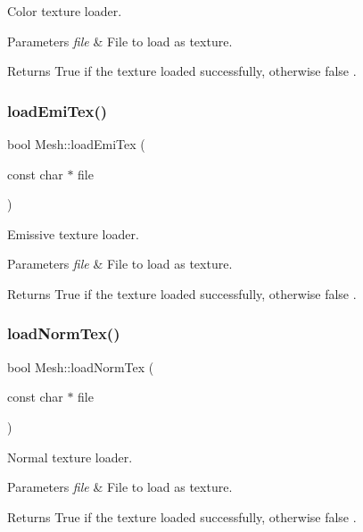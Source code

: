 Color texture loader. 


\begin{DoxyParams}{Parameters}
{\em file} & File to load as texture. \\
\hline
\end{DoxyParams}
\begin{DoxyReturn}{Returns}
True if the texture loaded successfully, otherwise false . 
\end{DoxyReturn}
\mbox{\label{class_mesh_abb21ce55711b89f7018d103b50294f69}} 
\subsubsection{\texorpdfstring{load\+Emi\+Tex()}{loadEmiTex()}}
{\footnotesize\ttfamily bool Mesh\+::load\+Emi\+Tex (\begin{DoxyParamCaption}\item[{const char $\ast$}]{file }\end{DoxyParamCaption})}



Emissive texture loader. 


\begin{DoxyParams}{Parameters}
{\em file} & File to load as texture. \\
\hline
\end{DoxyParams}
\begin{DoxyReturn}{Returns}
True if the texture loaded successfully, otherwise false . 
\end{DoxyReturn}
\mbox{\label{class_mesh_a443b1a0a0c36ff911f58f2a5f4616538}} 
\subsubsection{\texorpdfstring{load\+Norm\+Tex()}{loadNormTex()}}
{\footnotesize\ttfamily bool Mesh\+::load\+Norm\+Tex (\begin{DoxyParamCaption}\item[{const char $\ast$}]{file }\end{DoxyParamCaption})}



Normal texture loader. 


\begin{DoxyParams}{Parameters}
{\em file} & File to load as texture. \\
\hline
\end{DoxyParams}
\begin{DoxyReturn}{Returns}
True if the texture loaded successfully, otherwise false . 
\end{DoxyReturn}
\mbox{\label{class_mesh_ada437d0826057661de46ab5ce2b497a4}} 
